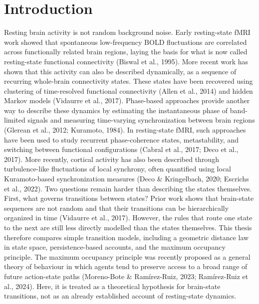 \documentclass[12pt,a4paper]{report}
\begin{document}
\chapter{Introduction}
Resting brain activity is not random background noise. Early resting-state fMRI work showed that spontaneous low-frequency BOLD fluctuations are correlated across functionally related brain regions, laying the basis for what is now called resting-state functional connectivity (Biswal et al., 1995). More recent work has shown that this activity can also be described dynamically, as a sequence of recurring whole-brain connectivity states. These states have been recovered using clustering of time-resolved functional connectivity (Allen et al., 2014) and hidden Markov models (Vidaurre et al., 2017). Phase-based approaches provide another way to describe these dynamics by estimating the instantaneous phase of band-limited signals and measuring time-varying synchronization between brain regions (Glerean et al., 2012; Kuramoto, 1984). In resting-state fMRI, such approaches have been used to study recurrent phase-coherence states, metastability, and switching between functional configurations (Cabral et al., 2017; Deco et al., 2017). More recently, cortical activity has also been described through turbulence-like fluctuations of local synchrony, often quantified using local Kuramoto-based synchronization measures (Deco \& Kringelbach, 2020; Escrichs et al., 2022). Two questions remain harder than describing the states themselves. First, what governs transitions between states? Prior work shows that brain-state sequences are not random and that their transitions can be hierarchically organized in time (Vidaurre et al., 2017). However, the rules that route one state to the next are still less directly modelled than the states themselves. This thesis therefore compares simple transition models, including a geometric distance law in state space, persistence-based accounts, and the maximum occupancy principle. The maximum occupancy principle was recently proposed as a general theory of behaviour in which agents tend to preserve access to a broad range of future action-state paths (Moreno-Bote \& Ram\'{i}rez-Ruiz, 2023; Ram\'{i}rez-Ruiz et al., 2024). Here, it is treated as a theoretical hypothesis for brain-state transitions, not as an already established account of resting-state dynamics.
\end{document}
